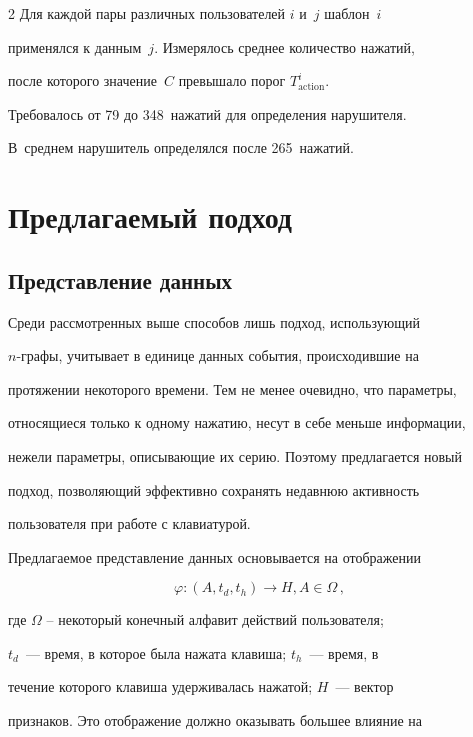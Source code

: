 \begin{multicols}{2}
Для каждой пары различных пользователей $i$ и~$j$ шаблон~$i$

применялся к данным~$j$. Измерялось среднее количество нажатий,

после которого значение~$C$ превышало порог $T^i_{\mathrm{action}}$.



Требовалось от 79 до 348~нажатий для определения нарушителя. 

В~среднем нарушитель определялся после 265~нажатий.



\section{Предлагаемый подход}



\subsection{Представление данных}



Среди рассмотренных выше способов лишь подход, использующий

$n$-гра\-фы, учитывает в единице данных события, происходившие на

протяжении некоторого времени. Тем не менее очевидно, что параметры,

относящиеся только к одному нажатию, несут в себе меньше информации,

нежели параметры, описывающие их серию. Поэтому предлагается новый

подход, позволяющий эффективно сохранять недавнюю активность

пользователя при работе с клавиатурой.



Предлагаемое представление данных основывается на отображении

$$

\varphi: (A, t_d, t_h) \rightarrow H, A \in \Omega\,,

$$

где $\Omega$ -- некоторый конечный алфавит действий пользователя;

$t_d$~--- время, в которое была нажата клавиша; $t_h$~--- время, в

течение которого клавиша удерживалась нажатой; $H$~--- вектор

признаков. Это отображение должно оказывать большее влияние на


\end{multicols}

